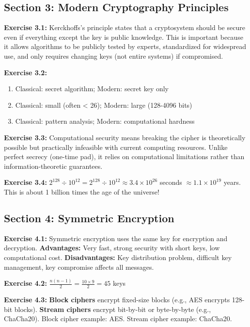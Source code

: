 \documentclass[11pt,a4paper]{report}
\begin{document}
\subsection*{Section 3: Modern Cryptography Principles}

\textbf{Exercise 3.1:}
Kerckhoffs's principle states that a cryptosystem should be secure even if everything except the key is public knowledge. This is important because it allows algorithms to be publicly tested by experts, standardized for widespread use, and only requires changing keys (not entire systems) if compromised.

\textbf{Exercise 3.2:}
\begin{enumerate}[label=\alph*)]
    \item Classical: secret algorithm; Modern: secret key only
    \item Classical: small (often < 26); Modern: large (128-4096 bits)
    \item Classical: pattern analysis; Modern: computational hardness
\end{enumerate}

\textbf{Exercise 3.3:}
Computational security means breaking the cipher is theoretically possible but practically infeasible with current computing resources. Unlike perfect secrecy (one-time pad), it relies on computational limitations rather than information-theoretic guarantees.

\textbf{Exercise 3.4:}
$2^{128} \div 10^{12} = 2^{128} \div 10^{12} \approx 3.4 \times 10^{26}$ seconds $\approx 1.1 \times 10^{19}$ years. This is about 1 billion times the age of the universe!

\subsection*{Section 4: Symmetric Encryption}

\textbf{Exercise 4.1:}
Symmetric encryption uses the same key for encryption and decryption. \textbf{Advantages:} Very fast, strong security with short keys, low computational cost. \textbf{Disadvantages:} Key distribution problem, difficult key management, key compromise affects all messages.

\textbf{Exercise 4.2:}
$\frac{n(n-1)}{2} = \frac{10 \times 9}{2} = 45$ keys

\textbf{Exercise 4.3:}
\textbf{Block ciphers} encrypt fixed-size blocks (e.g., AES encrypts 128-bit blocks). \textbf{Stream ciphers} encrypt bit-by-bit or byte-by-byte (e.g., ChaCha20). Block cipher example: AES. Stream cipher example: ChaCha20.
\end{document}
